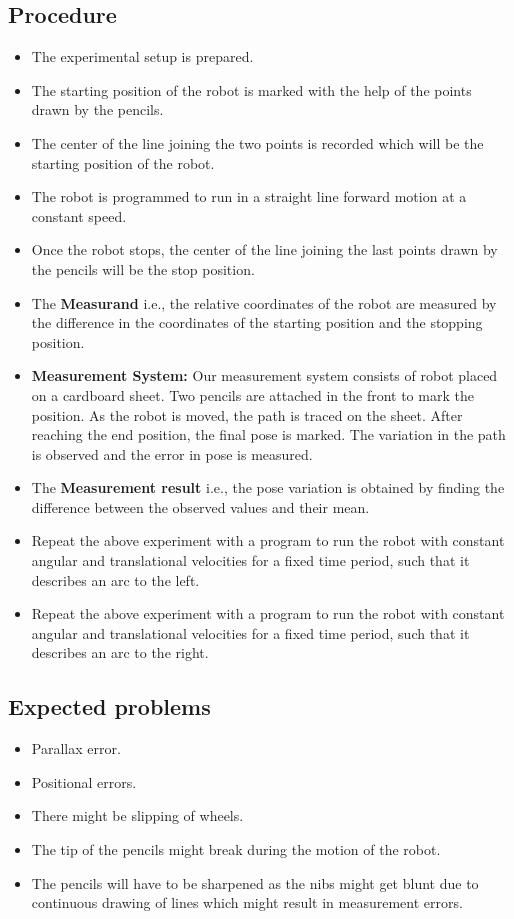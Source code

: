 \documentclass[11pt,a4paper]{article}
\begin{document}
\subsection{\textbf{Procedure}}
\begin{itemize}
\item The experimental setup is prepared.
\item The starting position of the robot is marked with the help of the points drawn by the pencils.
\item The center of the line joining the two points is recorded which will be the starting position of the robot.
\item The robot is programmed to run in a straight line forward motion at a constant speed.
\item Once the robot stops, the center of the line joining the last points drawn by the pencils will be the stop position.
\item The \textbf{Measurand} i.e., the relative coordinates of the robot are measured by the difference in the coordinates of the starting position and the stopping position.
\item \textbf{Measurement System:} Our measurement system consists of robot placed on a cardboard sheet. Two pencils are attached in the front to mark the position. As the robot is moved, the path is traced on the sheet. After reaching the end position, the final pose is marked. The variation in the path is observed and the error in pose is measured.
\item The \textbf{Measurement result} i.e., the pose variation is obtained by finding the difference between the observed values and their mean.
\item Repeat the above experiment with a program to run the robot with constant angular and translational velocities for a fixed time period, such that it describes an arc to the left.
\item Repeat the above experiment with a program to run the robot with constant angular and translational velocities for a fixed time period, such that it describes an arc to the right.
\end{itemize}

\subsection{\textbf{Expected problems}}
\begin{itemize}
\item Parallax error.
\item Positional errors.
\item There might be slipping of wheels.
\item The tip of the pencils might break during the motion of the robot.
\item The pencils will have to be sharpened as the nibs might get blunt due to continuous drawing of lines which might result in measurement errors.
\end{itemize}
\end{document}
